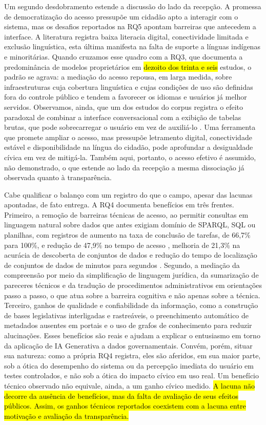 \documentclass[brazilian]{sbc2025}
\newif\ifhl \hltrue
\newcommand{\rev}[1]{\ifhl\sethlcolor{yellow}\hl{#1}\else#1\fi}
\begin{document}
Um segundo desdobramento estende a discussão do lado da recepção. A promessa de democratização do acesso pressupõe um cidadão apto a interagir com o sistema, mas os desafios reportados na RQ5 apontam barreiras que antecedem a interface. A literatura registra baixa literacia digital, conectividade limitada e exclusão linguística, esta última manifesta na falta de suporte a línguas indígenas e minoritárias. Quando cruzamos esse quadro com a RQ3, que documenta a predominância de modelos proprietários em \rev{dezoito dos trinta e seis} estudos, o padrão se agrava: a mediação do acesso repousa, em larga medida, sobre infraestruturas cuja cobertura linguística e cujas condições de uso são definidas fora do controle público e tendem a favorecer os idiomas e usuários já melhor servidos. Observamos, ainda, que um dos estudos do corpus registra o efeito paradoxal de combinar a interface conversacional com a exibição de tabelas brutas, que pode sobrecarregar o usuário em vez de auxiliá-lo \cite{EffectiveUseOGD2025}. Uma ferramenta que promete ampliar o acesso, mas pressupõe letramento digital, conectividade estável e disponibilidade na língua do cidadão, pode aprofundar a desigualdade cívica em vez de mitigá-la. Também aqui, portanto, o acesso efetivo é assumido, não demonstrado, o que estende ao lado da recepção a mesma dissociação já observada quanto à transparência.

Cabe qualificar o balanço com um registro do que o campo, apesar das lacunas apontadas, de fato entrega. A RQ4 documenta benefícios em três frentes. Primeiro, a remoção de barreiras técnicas de acesso, ao permitir consultas em linguagem natural sobre dados que antes exigiam domínio de SPARQL, SQL ou planilhas, com registros de aumento na taxa de conclusão de tarefas, de 66,7\% para 100\%, e redução de 47,9\% no tempo de acesso \cite{ChatbotMadrid2021}, melhoria de 21,3\% na acurácia de descoberta de conjuntos de dados \cite{Gan2026} e redução do tempo de localização de conjuntos de dados de minutos para segundos \cite{DesigningODAssistant2024}. Segundo, a mediação da compreensão por meio da simplificação de linguagem jurídica, da sumarização de pareceres técnicos e da tradução de procedimentos administrativos em orientações passo a passo, o que atua sobre a barreira cognitiva e não apenas sobre a técnica. Terceiro, ganhos de qualidade e confiabilidade da informação, como a construção de bases legislativas interligadas e rastreáveis, o preenchimento automático de metadados ausentes em portais e o uso de grafos de conhecimento para reduzir alucinações. Esses benefícios são reais e ajudam a explicar o entusiasmo em torno da aplicação de IA Generativa a dados governamentais. Convém, porém, situar sua natureza: como a própria RQ4 registra, eles são aferidos, em sua maior parte, sob a ótica do desempenho do sistema ou da percepção imediata do usuário em testes controlados, e não sob a ótica do impacto cívico em uso real. Um benefício técnico observado não equivale, ainda, a um ganho cívico medido. \rev{A lacuna não decorre da ausência de benefícios, mas da falta de avaliação de seus efeitos públicos. Assim, os ganhos técnicos reportados coexistem com a lacuna entre motivação e avaliação da transparência.}
\end{document}
